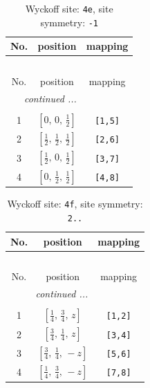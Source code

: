 \documentclass[fleqn,8pt]{jsarticle}
\begin{document}
\begin{longtable}{ccc}
\caption{Wyckoff site: {\tt 4e}, site symmetry: {\tt -1}}
 \\
 \hline \hline
No. & position & mapping \\ \hline \endfirsthead

\multicolumn{2}{l}{\tablename\ \thetable{}} \\
 \hline \hline
No. & position & mapping \\ \hline \endhead

 \hline \hline
\multicolumn{2}{r}{\footnotesize\it continued ...} \\ \endfoot

 \hline \hline
\multicolumn{2}{r}{} \\ \endlastfoot

1 & $\left[ 0,\, 0,\, \frac{1}{2} \right]$ & {\tt [1,5]} \\ \hline
2 & $\left[ \frac{1}{2},\, \frac{1}{2},\, \frac{1}{2} \right]$ & {\tt [2,6]} \\ \hline
3 & $\left[ \frac{1}{2},\, 0,\, \frac{1}{2} \right]$ & {\tt [3,7]} \\ \hline
4 & $\left[ 0,\, \frac{1}{2},\, \frac{1}{2} \right]$ & {\tt [4,8]} \\
\end{longtable}
\renewcommand{\arraystretch}{1.2}
\begin{longtable}{ccc}
\caption{Wyckoff site: {\tt 4f}, site symmetry: {\tt 2..}}
 \\
 \hline \hline
No. & position & mapping \\ \hline \endfirsthead

\multicolumn{2}{l}{\tablename\ \thetable{}} \\
 \hline \hline
No. & position & mapping \\ \hline \endhead

 \hline \hline
\multicolumn{2}{r}{\footnotesize\it continued ...} \\ \endfoot

 \hline \hline
\multicolumn{2}{r}{} \\ \endlastfoot

1 & $\left[ \frac{1}{4},\, \frac{3}{4},\, z \right]$ & {\tt [1,2]} \\ \hline
2 & $\left[ \frac{3}{4},\, \frac{1}{4},\, z \right]$ & {\tt [3,4]} \\ \hline
3 & $\left[ \frac{3}{4},\, \frac{1}{4},\, - z \right]$ & {\tt [5,6]} \\ \hline
4 & $\left[ \frac{1}{4},\, \frac{3}{4},\, - z \right]$ & {\tt [7,8]} \\
\end{longtable}
\end{document}
